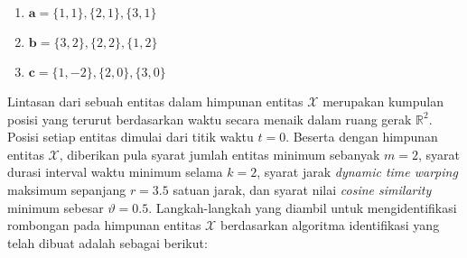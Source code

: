 \begin{enumerate}
    \item $\textbf{a} = \{ 1, 1 \}, \{ 2, 1 \}, \{ 3, 1 \}$
    \item $\textbf{b} = \{ 3, 2 \}, \{ 2, 2 \}, \{ 1, 2 \}$
    \item $\textbf{c} = \{ 1, -2 \}, \{ 2, 0 \}, \{ 3, 0 \}$
\end{enumerate}

Lintasan dari sebuah entitas dalam himpunan entitas $\mathcal{X}$ merupakan kumpulan posisi yang terurut berdasarkan waktu secara menaik dalam ruang gerak $\mathbb{R}^2$. Posisi setiap entitas dimulai dari titik waktu $t = 0$. Beserta dengan himpunan entitas $\mathcal{X}$, diberikan pula syarat jumlah entitas minimum sebanyak $m = 2$, syarat durasi interval waktu minimum selama $k = 2$, syarat jarak \textit{dynamic time warping} maksimum sepanjang $r = 3.5$ satuan jarak, dan syarat nilai \textit{cosine similarity} minimum sebesar $\vartheta = 0.5$. Langkah-langkah yang diambil untuk mengidentifikasi rombongan pada himpunan entitas $\mathcal{X}$ berdasarkan algoritma identifikasi yang telah dibuat adalah sebagai berikut:

